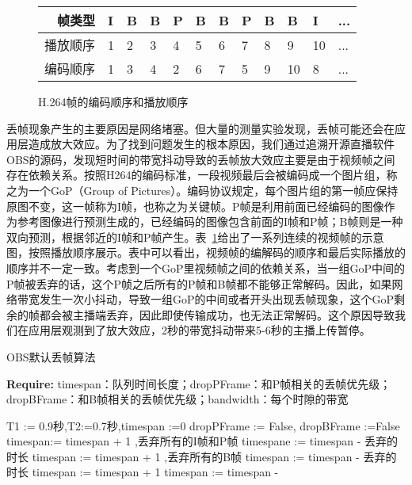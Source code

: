 \begin{figure}[h]
    \centering
    \begin{tabularx}{\linewidth}{rXXXXXXXXXXX}
        \toprule[1.5pt]
        帧类型       & I & B & B & P & B & B & P & B & B  & I  & ... \\ \midrule[1pt]
        播放顺序   & 1 & 2 & 3 & 4 & 5 & 6 & 7 & 8 & 9  & 10 & ... \\
        编码顺序 & 1 & 3 & 4 & 2 & 6 & 7 & 5 & 9 & 10 & 8  & ... \\
        \bottomrule[1.5pt]
    \end{tabularx}
    \caption{H.264帧的编码顺序和播放顺序}
    \label{fig:frame-order}
\end{figure}

丢帧现象产生的主要原因是网络堵塞。但大量的测量实验发现，丢帧可能还会在应用层造成放大效应。为了找到问题发生的根本原因，我们通过追溯开源直播软件OBS的源码，发现短时间的带宽抖动导致的丢帧放大效应主要是由于视频帧之间存在依赖关系。按照H264的编码标准，一段视频最后会被编码成一个图片组，称之为一个GoP（Group of Pictures）。编码协议规定，每个图片组的第一帧应保持原图不变，这一帧称为I帧，也称之为关键帧。P帧是利用前面已经编码的图像作为参考图像进行预测生成的，已经编码的图像包含前面的I帧和P帧；B帧则是一种双向预测，根据邻近的I帧和P帧产生。表~\ref{fig:frame-order}给出了一系列连续的视频帧的示意图，按照播放顺序展示。表中可以看出，视频帧的编解码的顺序和最后实际播放的顺序并不一定一致。考虑到一个GoP里视频帧之间的依赖关系，当一组GoP中间的P帧被丢弃的话，这个P帧之后所有的P帧和B帧都不能够正常解码。因此，如果网络带宽发生一次小抖动，导致一组GoP的中间或者开头出现丢帧现象，这个GoP剩余的帧都会被主播端丢弃，因此即使传输成功，也无法正常解码。这个原因导致我们在应用层观测到了放大效应，2秒的带宽抖动带来5-6秒的主播上传暂停。

\begin{algorithm}[htb]
\caption{OBS默认丢帧算法}
\label{alg:obs-drop}
{\bf Require:} timespan：队列时间长度；dropPFrame：和P帧相关的丢帧优先级；dropBFrame：和B帧相关的丢帧优先级；bandwidth：每个时隙的带宽
\begin{algorithmic}[1]
\State T1 := 0.9秒,T2:=0.7秒,timespan :=0
\State dropPFrame := False, dropBFrame :=False
\State {}
\State timespan:= timespan + 1
\EndIf
{}
\State {},丢弃所有的I帧和P帧
\State timespane := timespan - 丢弃的时长
\Else
\State {}
\State timespan := timespan + 1
\EndIf
\EndIf
{}
\State {},丢弃所有的B帧
\State timespan := timespan - 丢弃的时长
\Else
\State {}
\State timespan := timespan + 1
\EndIf
\EndIf
\State timespan := timespan - 
\end{algorithmic}
\end{algorithm}


